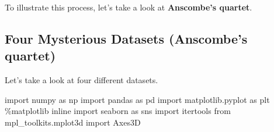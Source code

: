 \documentclass[
  letterpaper,
  DIV=11,
  numbers=noendperiod]{scrreprt}
\newenvironment{Shaded}{\begin{snugshade}}{\end{snugshade}}
\newcommand{\ImportTok}[1]{\textcolor[rgb]{0.00,0.46,0.62}{#1}}
\newcommand{\NormalTok}[1]{\textcolor[rgb]{0.00,0.23,0.31}{#1}}
\newcommand{\OperatorTok}[1]{\textcolor[rgb]{0.37,0.37,0.37}{#1}}
\begin{document}
To illustrate this process, let's take a look at \textbf{Anscombe's
quartet}.

\subsection{Four Mysterious Datasets (Anscombe's
quartet)}\label{four-mysterious-datasets-anscombes-quartet}

Let's take a look at four different datasets.

\begin{Shaded}
\begin{Highlighting}[]
\ImportTok{import}\NormalTok{ numpy }\ImportTok{as}\NormalTok{ np}
\ImportTok{import}\NormalTok{ pandas }\ImportTok{as}\NormalTok{ pd}
\ImportTok{import}\NormalTok{ matplotlib.pyplot }\ImportTok{as}\NormalTok{ plt}
\OperatorTok{\%}\NormalTok{matplotlib inline}
\ImportTok{import}\NormalTok{ seaborn }\ImportTok{as}\NormalTok{ sns}
\ImportTok{import}\NormalTok{ itertools}
\ImportTok{from}\NormalTok{ mpl\_toolkits.mplot3d }\ImportTok{import}\NormalTok{ Axes3D}
\end{Highlighting}
\end{Shaded}
\end{document}
